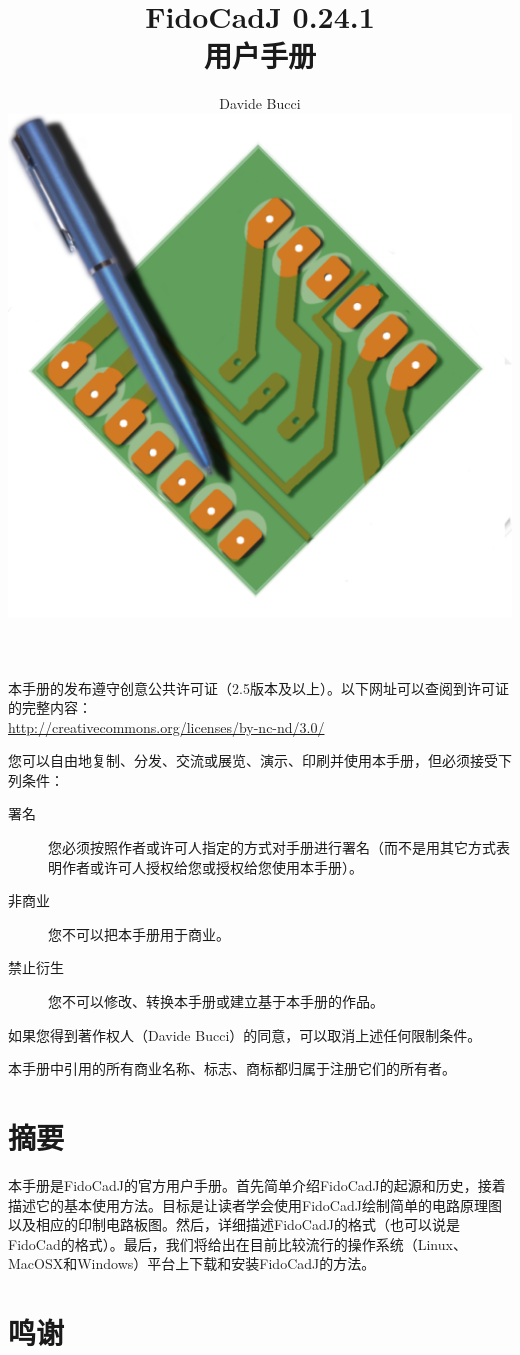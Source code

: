 \documentclass[10pt,a4paper,twoside]{scrreprt}
\title{\Huge\color{webbrown} FidoCadJ 0.24.1 \\ 用户手册}
\author{Davide Bucci\\[3em]
\includegraphics[width=.7\textwidth]{icona_fidocadj_a}
}
\begin{document}

\maketitle 

\clearpage{}

本手册的发布遵守创意公共许可证（2.5版本及以上）。以下网址可以查阅到许可证的完整内容：\\ \href{http://creativecommons.org/licenses/by-nc-nd/3.0/}{http://creativecommons.org/licenses/by-nc-nd/3.0/}

您可以自由地复制、分发、交流或展览、演示、印刷并使用本手册，但必须接受下列条件：
\begin{description}
\item [{署名}] {您必须按照作者或许可人指定的方式对手册进行署名（而不是用其它方式表明作者或许可人授权给您或授权给您使用本手册）。} 
\item [{非商业}] {您不可以把本手册用于商业。} 
\item [{禁止衍生}] {您不可以修改、转换本手册或建立基于本手册的作品。} 
\end{description}
如果您得到著作权人（Davide Bucci）的同意，可以取消上述任何限制条件。

\vfill{}
本手册中引用的所有商业名称、标志、商标都归属于注册它们的所有者。



\clearpage{}
\chapter*{摘要} %

本手册是FidoCadJ的官方用户手册。首先简单介绍FidoCadJ的起源和历史，接着描述它的基本使用方法。目标是让读者学会使用FidoCadJ绘制简单的电路原理图以及相应的印制电路板图。然后，详细描述FidoCadJ的格式（也可以说是FidoCad的格式）。最后，我们将给出在目前比较流行的操作系统（Linux、MacOSX和Windows）平台上下载和安装FidoCadJ的方法。


\clearpage{}
\chapter*{鸣谢} %
\end{document}
